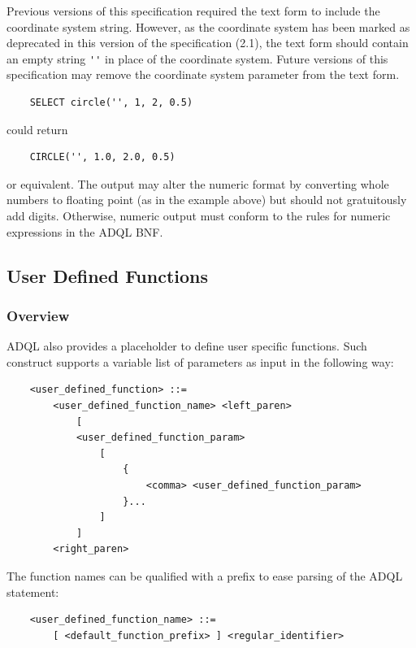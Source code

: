 \documentclass[11pt,a4paper]{ivoa}
\begin{document}
Previous versions of this specification required the text form to include the
coordinate system string. However, as the coordinate system has been marked
as deprecated in this version of the specification (2.1), the text form
should contain an empty string \verb:'': in place of the coordinate
system. Future versions of this specification may remove the coordinate
system parameter from the text form.

\begin{verbatim}
    SELECT circle('', 1, 2, 0.5)
\end{verbatim}

could return

\begin{verbatim}
    CIRCLE('', 1.0, 2.0, 0.5)
\end{verbatim}

or equivalent.
The output may alter the numeric format by converting whole numbers to
floating point (as in the example above) but should not gratuitously add
digits. Otherwise, numeric output must conform to the rules for numeric
expressions in the ADQL BNF.

\subsection{User Defined Functions}
\label{sec:user.functions}
\subsubsection{Overview}

ADQL also provides a placeholder to define user specific functions. Such
construct supports a variable list of parameters as input in the following way:

\begin{verbatim}
    <user_defined_function> ::=
        <user_defined_function_name> <left_paren>
            [
            <user_defined_function_param>
                [
                    {
                        <comma> <user_defined_function_param>
                    }...
                ]
            ]
        <right_paren>
\end{verbatim}

The function names can be qualified with a prefix to ease parsing of the
ADQL statement:

\begin{verbatim}
    <user_defined_function_name> ::=
        [ <default_function_prefix> ] <regular_identifier>
\end{verbatim}
\end{document}
